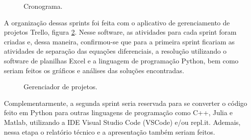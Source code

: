 \documentclass[a4paper,11pt]{article}
\begin{document}
    \begin{figure}[H]
        \centering
        \caption[width=\columnwidth]{Cronograma.}
        \label{cronograma}
    \end{figure}
    
    A organização dessas sprints foi feita com o aplicativo de gerenciamento de projetos Trello, figura \ref{Trello}. Nesse software, as atividades para cada sprint foram criadas e, dessa maneira, confirmou-se que para a primeira sprint ficariam as atividades de separação das equações diferenciais, a resolução utilizando o software de planilhas Excel e a linguagem de programação Python, bem como seriam feitos os gráficos e análises das soluções encontradas.
    
    \begin{figure}[H]
        \centering
        \caption[width=\columnwidth]{Gerenciador de projetos.}
        \label{Trello}
    \end{figure}
    
    Complementarmente, a segunda sprint seria reservada para se converter o código feito em Python para outras linguagens de programação como C++, Julia e Matlab, utilizando a IDE Visual Studio Code (VSCode) e/ou repl.it. Ademais, nessa etapa o relatório técnico e a apresentação também seriam feitos. 
    
\end{document}
